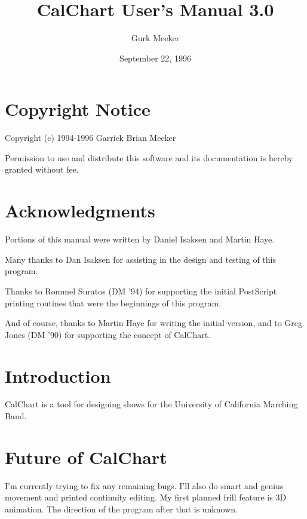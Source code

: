 \title{CalChart User's Manual 3.0}
\author{Gurk Meeker}
\date{September 22, 1996}
\makeindex

\maketitle
\tableofcontents

\chapter*{Copyright Notice}\label{copyright}

Copyright (c) 1994-1996 Garrick Brian Meeker

Permission to use and distribute this software and its documentation is
hereby granted without fee.

\chapter*{Acknowledgments}\label{acknowledge}

Portions of this manual were written by Daniel Isaksen and Martin Haye.

Many thanks to Dan Isaksen for assisting in the design and testing of
this program.

Thanks to Rommel Suratos (DM '94) for supporting the initial PostScript
printing routines that were the beginnings of this program.

And of course, thanks to Martin Haye for writing the initial version,
and to Greg Jones (DM '90) for supporting the concept of CalChart.

\chapter{Introduction}

CalChart is a tool for designing shows for the University of California
Marching Band.






\chapter{Future of CalChart}\label{future}

I'm currently trying to fix any remaining bugs.  I'll also do smart and
genius movement and printed continuity editing.  My first planned frill
feature is 3D animation.  The direction of the program after that is unknown.


